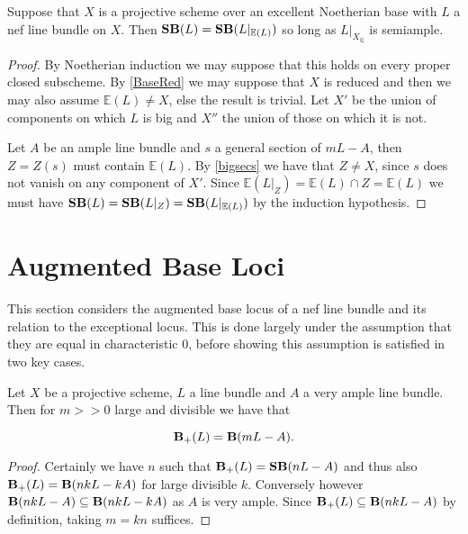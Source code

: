 \begin{corollary}\label{Main_Loci2}
	Suppose that $X$ is a projective scheme over an excellent Noetherian base with $L$ a nef line bundle on $X$. Then $\mathbf{SB}(L)=\mathbf{SB}(L|_{\mathbb{E}(L)})$ so long as $L|_{X_{\mathbb{Q}}}$ is semiample.
\end{corollary}
\begin{proof}
	By Noetherian induction we may suppose that this holds on every proper closed subscheme. By \autoref{BaseRed} we may suppose that $X$ is reduced and then we may also assume $\mathbb{E}(L) \neq X$, else the result is trivial. Let $X'$ be the union of components on which $L$ is big and $X''$ the union of those on which it is not.
	
	Let $A$ be an ample line bundle and $s$ a general section of $mL-A$, then $Z=Z(s)$ must contain $\mathbb{E}(L)$. By \autoref{bigsecs} we have that $Z \neq X$, since $s$ does not vanish on any component of $X'$. Since $\mathbb{E}(L|_{Z}) = \mathbb{E}(L)\cap Z= \mathbb{E}(L)$ we must have $\mathbf{SB}(L)=\mathbf{SB}(L|_{Z})=\mathbf{SB}(L|_{\mathbb{E}(L)})$ by the induction hypothesis. 
\end{proof}



\section{Augmented Base Loci}

This section considers the augmented base locus of a nef line bundle and its relation to the exceptional locus. This is done largely under the assumption that they are equal in characteristic $0$, before showing this assumption is satisfied in two key cases.


\begin{lemma}\label{amp}
	Let $X$ be a projective scheme, $L$ a line bundle and $A$ a very ample line bundle. Then for $m>>0$ large and divisible we have that 
	
	$$\mathbf{B}_{+}(L)=\mathbf{B}(mL-A).$$
\end{lemma}

\begin{proof}
	Certainly we have $n$ such that $\mathbf{B}_{+}(L)=\mathbf{SB}(nL-A)$ and thus also $\mathbf{B}_{+}(L)=\mathbf{B}(nkL-kA)$ for large divisible $k$. Conversely however $\mathbf{B}(nkL-A)\subseteq \mathbf{B}(nkL-kA)$ as $A$ is very ample. Since $\mathbf{B}_{+}(L)\subseteq \mathbf{B}(nkL-A)$ by definition, taking $m=kn$ suffices.
\end{proof}

